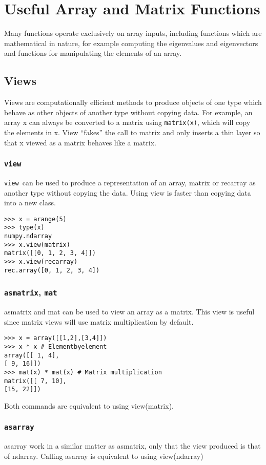 \documentclass[Pydata.tex]{subfiles}
\begin{document}
 

\section{Useful Array and Matrix Functions}
Many functions operate exclusively on array inputs, including functions which are mathematical in nature,
for example computing the eigenvalues and eigenvectors and functions for manipulating the elements
of an array.

\subsection*{Views}
Views are computationally efficient methods to produce objects of one type which behave as other objects
of another type without copying data. For example, an array x can always be converted to a matrix using
\texttt{matrix(x)}, which will copy the elements in x. View “fakes” the call to matrix and only inserts a thin layer
so that x viewed as a matrix behaves like a matrix.
\subsubsection{\texttt{view}}
\texttt{view }can be used to produce a representation of an array, matrix or recarray as another type without copying
the data. Using view is faster than copying data into a new class.
\begin{framed}
\begin{verbatim}
>>> x = arange(5)
>>> type(x)
numpy.ndarray
>>> x.view(matrix)
matrix([[0, 1, 2, 3, 4]])
>>> x.view(recarray)
rec.array([0, 1, 2, 3, 4])
\end{verbatim}
\end{framed}
\subsubsection*{\texttt{asmatrix}, \texttt{mat}}
asmatrix and mat can be used to view an array as a matrix. This view is useful since matrix views will use
matrix multiplication by default.
\begin{framed}
\begin{verbatim}
>>> x = array([[1,2],[3,4]])
>>> x * x # Elementbyelement
array([[ 1, 4],
[ 9, 16]])
>>> mat(x) * mat(x) # Matrix multiplication
matrix([[ 7, 10],
[15, 22]])
\end{verbatim}
\end{framed}
Both commands are equivalent to using view(matrix).
\subsubsection{\texttt{asarray}}
asarray work in a similar matter as asmatrix, only that the view produced is that of ndarray. Calling
asarray is equivalent to using view(ndarray)
\end{document}
